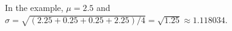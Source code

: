 In the example, $\mu = 2.5$ and $\sigma = \sqrt{(2.25 + 0.25 + 0.25 + 2.25) / 4} = \sqrt{1.25} \approx 1.118034$.
